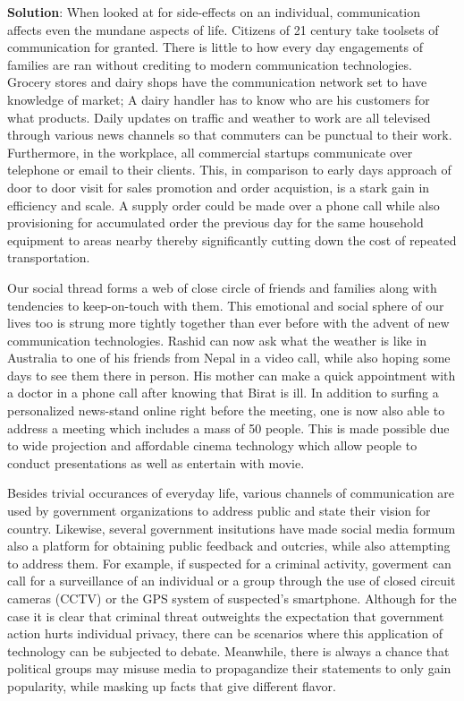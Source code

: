 \documentclass[
]{book}
\newenvironment{solution}{ {\bfseries Solution}:}{}
\begin{document}
\begin{solution}
When looked at for side-effects on an individual, communication affects even the mundane aspects of life. Citizens of 21 century take toolsets of communication for granted. There is little to how every day engagements of families are ran without crediting to modern communication technologies. Grocery stores and dairy shops have the communication network set to have knowledge of market; A dairy handler has to know who are his customers for what products. Daily updates on traffic and weather to work are all televised through various news channels so that commuters can be punctual to their work. Furthermore, in the workplace, all commercial startups communicate over telephone or email to their clients. This, in comparison to early days approach of door to door visit for sales promotion and order acquistion, is a stark gain in efficiency and scale. A supply order could be made over a phone call while also provisioning for accumulated order the previous day for the same household equipment to areas nearby thereby significantly cutting down the cost of repeated transportation.

Our social thread forms a web of close circle of friends and families along with tendencies to keep-on-touch with them. This emotional and social sphere of our lives too is strung more tightly together than ever before with the advent of new communication technologies. Rashid can now ask what the weather is like in Australia to one of his friends from Nepal in a video call, while also hoping some days to see them there in person. His mother can make a quick appointment with a doctor in a phone call after knowing that Birat is ill. In addition to surfing a personalized news-stand online right before the meeting, one is now also able to address a meeting which includes a mass of 50 people. This is made possible due to wide projection and affordable cinema technology which allow people to conduct presentations as well as entertain with movie.

Besides trivial occurances of everyday life, various channels of communication are used by government organizations to address public and state their vision for country. Likewise, several government insitutions have made social media formum also a platform for obtaining public feedback and outcries, while also attempting to address them. For example, if suspected for a criminal activity, goverment can call for a surveillance of an individual or a group through the use of closed circuit cameras (CCTV) or the GPS system of suspected's smartphone. Although for the case it is clear that criminal threat outweights the expectation that government action hurts individual privacy, there can be scenarios where this application of technology can be subjected to debate. Meanwhile, there is always a chance that political groups may misuse media to propagandize their statements to only gain popularity, while masking up facts that give different flavor.


\end{solution}
\end{document}
